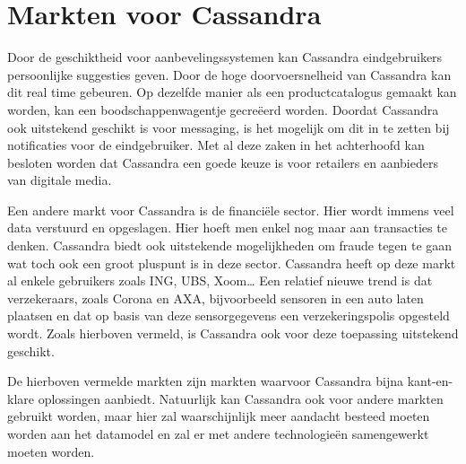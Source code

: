 \section{Markten voor Cassandra}
Door de geschiktheid voor aanbevelingssystemen kan Cassandra eindgebruikers persoonlijke suggesties geven.
Door de hoge doorvoersnelheid van Cassandra kan dit real time gebeuren.
Op dezelfde manier als een productcatalogus gemaakt kan worden, kan een boodschappenwagentje gecreëerd worden.
Doordat Cassandra ook uitstekend geschikt is voor messaging, is het mogelijk om dit in te zetten bij notificaties voor de eindgebruiker.
Met al deze zaken in het achterhoofd kan besloten worden dat Cassandra een goede keuze is voor retailers en aanbieders van digitale media.

Een andere markt voor Cassandra is de financiële sector.
Hier wordt immens veel data verstuurd en opgeslagen.
Hier hoeft men enkel nog maar aan transacties te denken.
Cassandra biedt ook uitstekende mogelijkheden om fraude tegen te gaan wat toch ook een groot pluspunt is in deze sector.
Cassandra heeft op deze markt al enkele gebruikers zoals ING, UBS, Xoom\dots
Een relatief nieuwe trend is dat verzekeraars, zoals Corona en AXA, bijvoorbeeld sensoren in een auto laten plaatsen en dat op basis van deze sensorgegevens een verzekeringspolis opgesteld wordt.
Zoals hierboven vermeld, is Cassandra ook voor deze toepassing uitstekend geschikt.

De hierboven vermelde markten zijn markten waarvoor Cassandra bijna kant-en-klare oplossingen aanbiedt.
Natuurlijk kan Cassandra ook voor andere markten gebruikt worden, maar hier zal waarschijnlijk meer aandacht besteed moeten worden aan het datamodel en zal er met andere technologieën samengewerkt moeten worden.